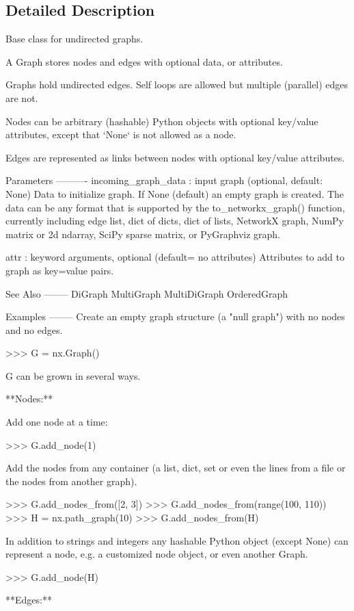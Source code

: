 \subsection{Detailed Description}
\begin{DoxyVerb}Base class for undirected graphs.

A Graph stores nodes and edges with optional data, or attributes.

Graphs hold undirected edges.  Self loops are allowed but multiple
(parallel) edges are not.

Nodes can be arbitrary (hashable) Python objects with optional
key/value attributes, except that `None` is not allowed as a node.

Edges are represented as links between nodes with optional
key/value attributes.

Parameters
----------
incoming_graph_data : input graph (optional, default: None)
    Data to initialize graph. If None (default) an empty
    graph is created.  The data can be any format that is supported
    by the to_networkx_graph() function, currently including edge list,
    dict of dicts, dict of lists, NetworkX graph, NumPy matrix
    or 2d ndarray, SciPy sparse matrix, or PyGraphviz graph.

attr : keyword arguments, optional (default= no attributes)
    Attributes to add to graph as key=value pairs.

See Also
--------
DiGraph
MultiGraph
MultiDiGraph
OrderedGraph

Examples
--------
Create an empty graph structure (a "null graph") with no nodes and
no edges.

>>> G = nx.Graph()

G can be grown in several ways.

**Nodes:**

Add one node at a time:

>>> G.add_node(1)

Add the nodes from any container (a list, dict, set or
even the lines from a file or the nodes from another graph).

>>> G.add_nodes_from([2, 3])
>>> G.add_nodes_from(range(100, 110))
>>> H = nx.path_graph(10)
>>> G.add_nodes_from(H)

In addition to strings and integers any hashable Python object
(except None) can represent a node, e.g. a customized node object,
or even another Graph.

>>> G.add_node(H)

**Edges:**


\end{DoxyVerb}
